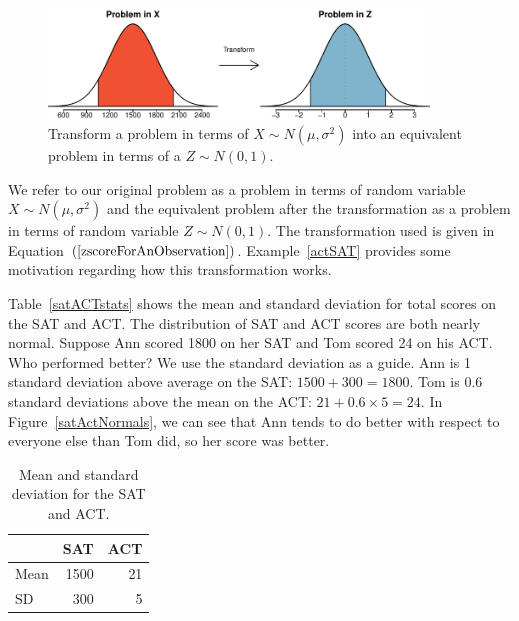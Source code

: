 
\begin{figure}[H]
\centering
\includegraphics[width=0.9\textwidth]{03/figures2/normal/normalPribInXtoProbInZ/normalPribInXtoProbInZ.pdf}
\caption{Transform a problem in terms of $X \sim N(\mu,\sigma^{2})$ into an equivalent
problem in terms of a $Z \sim N(0, 1)$.}
\end{figure}

We refer to our original problem as a problem in terms of random variable $X \sim N(\mu, \sigma^{2})$
and the equivalent problem after the transformation as a problem in terms of random variable 
$Z \sim N(0, 1)$.
The transformation used is given in Equation $(\ref{zscoreForAnObservation})$.
Example~\ref{actSAT} provides some motivation regarding how this transformation works.


\begin{example}{Table~\vref{satACTstats} shows the mean and standard deviation for total scores on the SAT and ACT. The distribution of SAT and ACT scores are both nearly normal. Suppose Ann scored 1800 on her SAT and Tom scored 24 on his ACT. Who performed better?}\label{actSAT}
We use the standard deviation as a guide. Ann is 1 standard deviation above average on the SAT: $1500 + 300=1800$. Tom is 0.6 standard deviations above the mean on the ACT: $21+0.6\times 5=24$. In Figure~\ref{satActNormals}, we can see that Ann tends to do better with respect to everyone else than Tom did, so her score was better.
\end{example}

\begin{table}[H]
\centering
\begin{tabular}{l r r}
  \hline
  & SAT & ACT \\
  \hline
Mean \hspace{0.3cm} & 1500 & 21 \\
SD & 300 & 5 \\
   \hline
\end{tabular}
\caption{Mean and standard deviation for the SAT and ACT.}
\label{satACTstats}
\end{table}

